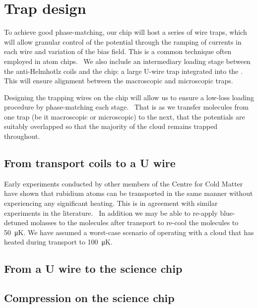 \section{Trap design}

To achieve good phase-matching, our chip will host a series of wire traps,
which will allow granular control of the potential through the ramping of
currents in each wire and variation of the bias field. This is a common
technique often employed in atom chips.~\cite{} We also include an intermediary
loading stage between the anti-Helmhotlz coils and the chip: a large U-wire
trap integrated into the . This will ensure alignment
between the macroscopic and microscopic traps.

Designing the trapping wires on the chip will allow us to ensure a low-loss
loading procedure by phase-matching each stage.~\cite{Crompvoets2005} That is
as we transfer molecules from one trap (be it macroscopic or microscopic) to
the next, that the potentials are suitably overlapped so that the majority of
the cloud remains trapped throughout.

\subsection{From transport coils to a U wire}

Early experiments conducted by other members of the Centre for Cold Matter have
shown that rubidium atoms can be transported in the same manner without
experiencing any significant heating. This is in agreement with similar
experiments in the literature.~\cite{} In addition we may be able to re-apply
blue-detuned molasses to the molecules after transport to re-cool the molecules
to \SI{50}{\micro\kelvin}. We have assumed a worst-case scenario of operating
with a cloud that has heated during transport to \SI{100}{\micro\kelvin}.


\subsection{From a U wire to the science chip}



\subsection{Compression on the science chip}

